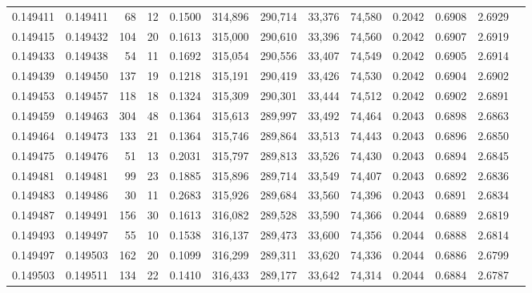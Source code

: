 \begin{tabular}{rrrrrrrrrrrrr}
0.149411 & 0.149411 &    68 &  12 &                                     0.1500 & 314,896 & 290,714 &  33,376 &  74,580 & 0.2042 & 0.6908 & 2.6929 \\
0.149415 & 0.149432 &   104 &  20 &                                     0.1613 & 315,000 & 290,610 &  33,396 &  74,560 & 0.2042 & 0.6907 & 2.6919 \\
0.149433 & 0.149438 &    54 &  11 &                                     0.1692 & 315,054 & 290,556 &  33,407 &  74,549 & 0.2042 & 0.6905 & 2.6914 \\
0.149439 & 0.149450 &   137 &  19 &                                     0.1218 & 315,191 & 290,419 &  33,426 &  74,530 & 0.2042 & 0.6904 & 2.6902 \\
0.149453 & 0.149457 &   118 &  18 &                                     0.1324 & 315,309 & 290,301 &  33,444 &  74,512 & 0.2042 & 0.6902 & 2.6891 \\
0.149459 & 0.149463 &   304 &  48 &                                     0.1364 & 315,613 & 289,997 &  33,492 &  74,464 & 0.2043 & 0.6898 & 2.6863 \\
0.149464 & 0.149473 &   133 &  21 &                                     0.1364 & 315,746 & 289,864 &  33,513 &  74,443 & 0.2043 & 0.6896 & 2.6850 \\
0.149475 & 0.149476 &    51 &  13 &                                     0.2031 & 315,797 & 289,813 &  33,526 &  74,430 & 0.2043 & 0.6894 & 2.6845 \\
0.149481 & 0.149481 &    99 &  23 &                                     0.1885 & 315,896 & 289,714 &  33,549 &  74,407 & 0.2043 & 0.6892 & 2.6836 \\
0.149483 & 0.149486 &    30 &  11 &                                     0.2683 & 315,926 & 289,684 &  33,560 &  74,396 & 0.2043 & 0.6891 & 2.6834 \\
0.149487 & 0.149491 &   156 &  30 &                                     0.1613 & 316,082 & 289,528 &  33,590 &  74,366 & 0.2044 & 0.6889 & 2.6819 \\
0.149493 & 0.149497 &    55 &  10 &                                     0.1538 & 316,137 & 289,473 &  33,600 &  74,356 & 0.2044 & 0.6888 & 2.6814 \\
0.149497 & 0.149503 &   162 &  20 &                                     0.1099 & 316,299 & 289,311 &  33,620 &  74,336 & 0.2044 & 0.6886 & 2.6799 \\
0.149503 & 0.149511 &   134 &  22 &                                     0.1410 & 316,433 & 289,177 &  33,642 &  74,314 & 0.2044 & 0.6884 & 2.6787 \\

\end{tabular}
